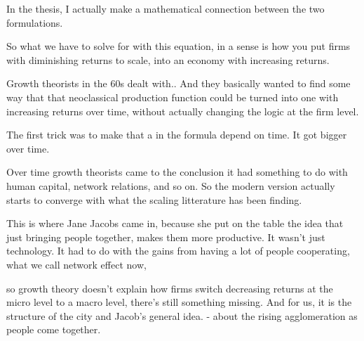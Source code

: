 \documentclass[]{article}
\begin{document}
In the thesis, I actually make a mathematical connection between the two formulations.

So what we have to solve for with this equation, in a sense is how you put firms with diminishing returns to scale, into an economy with increasing returns. %




Growth theorists in the 60s dealt with..
And they basically wanted to find some way that that neoclassical production function could be turned into one with increasing returns over time, without actually changing the logic at the firm level.


The first trick was to make that a in the formula depend on time. It got bigger over time.

Over time  growth theorists came to the conclusion it had something to do with human capital, network relations, and so on. So the modern version actually starts to converge with what the scaling litterature has been finding. 

This is where Jane Jacobs came in, because she put on the table the idea that just bringing people together, makes them more productive. It wasn't just technology. It had to do with the gains from having a lot of people cooperating,  what we call  network effect now, 

so growth theory doesn't explain how firms switch decreasing returns at the micro level to a macro level, there's still something missing. 
And for us, it is the structure of the city and Jacob's general idea. - about the rising agglomeration as people come together. 
\end{document}

